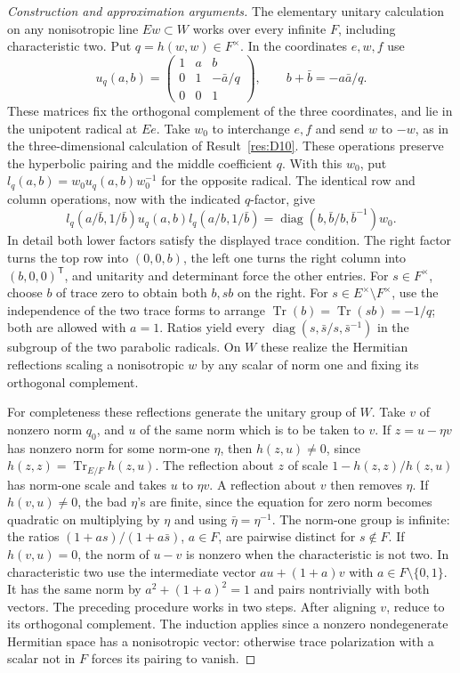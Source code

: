 \documentclass[11pt,a4paper,openany,oneside]{book}
\theoremstyle{resultstyle}
\theoremstyle{definition}
\numberwithin{equation}{chapter}
\begin{document}
\begin{proof}[Construction and approximation arguments]
The elementary unitary calculation on any nonisotropic line
\(Ew\subset W\) works over every infinite \(F\), including
characteristic two. Put \(q=h(w,w)\in F^\times\).
In the coordinates \(e,w,f\) use
\[
 u_q(a,b)=\begin{pmatrix}
 1&a&b\\0&1&-\bar a/q\\0&0&1
 \end{pmatrix},\qquad b+\bar b=-a\bar a/q.
\]
These matrices fix the orthogonal complement of the three
coordinates, and lie in the unipotent radical at \(Ee\).
Take \(w_0\) to interchange \(e,f\) and send \(w\) to
\(-w\), as in the three-dimensional calculation of
Result~\ref{res:D10}. These operations preserve the
hyperbolic pairing and the middle coefficient \(q\).
With this \(w_0\),
put \(l_q(a,b)=w_0u_q(a,b)w_0^{-1}\) for the opposite
radical. The identical row and column operations, now
with the indicated \(q\)-factor, give
\[
 l_q(a/\bar b,1/\bar b)u_q(a,b)l_q(a/b,1/\bar b)
       =\operatorname{diag}(b,\bar b/b,\bar b^{-1})w_0 .
\]
In detail both lower factors satisfy the displayed trace
condition. The right factor turns the top row into
\((0,0,b)\), the left one turns the right column into
\((b,0,0)^{\mathsf T}\), and unitarity and determinant
force the other entries. For \(s\in F^\times\), choose
\(b\) of trace zero to obtain both \(b,sb\) on the
right. For \(s\in E^\times\setminus F^\times\), use the
independence of the two trace forms to arrange
\(\operatorname{Tr}(b)=\operatorname{Tr}(sb)=-1/q\);
both are allowed with \(a=1\). Ratios yield every
\(\operatorname{diag}(s,\bar s/s,\bar s^{-1})\) in
the subgroup of the two parabolic radicals. On \(W\)
these realize the Hermitian reflections scaling a
nonisotropic \(w\) by any scalar of norm one and
fixing its orthogonal complement.

For completeness these reflections generate the unitary
group of \(W\). Take \(v\) of nonzero norm \(q_0\), and
\(u\) of the same norm which is to be taken to \(v\).
If \(z=u-\eta v\) has nonzero norm for some norm-one
\(\eta\), then \(h(z,u)\ne0\), since
\(h(z,z)=\operatorname{Tr}_{E/F}h(z,u)\).
The reflection about \(z\) of scale
\(1-h(z,z)/h(z,u)\) has norm-one scale and takes \(u\)
to \(\eta v\). A reflection about \(v\) then removes
\(\eta\). If \(h(v,u)\ne0\), the bad \(\eta\)'s are
finite, since the equation for zero norm becomes
quadratic on multiplying by \(\eta\) and using
\(\bar\eta=\eta^{-1}\). The norm-one group is infinite:
the ratios \((1+as)/(1+a\bar s)\), \(a\in F\),
are pairwise distinct for \(s\notin F\).
If \(h(v,u)=0\), the norm of \(u-v\) is nonzero when
the characteristic is not two. In characteristic two
use the intermediate vector \(a u+(1+a)v\) with
\(a\in F\setminus\{0,1\}\). It has the same norm by
\(a^2+(1+a)^2=1\) and pairs nontrivially with both
vectors. The preceding procedure works in two steps.
After aligning \(v\), reduce to its orthogonal
complement. The induction applies since a nonzero
nondegenerate Hermitian space has a nonisotropic
vector: otherwise trace polarization with a scalar
not in \(F\) forces its pairing to vanish.


\end{proof}
\end{document}
